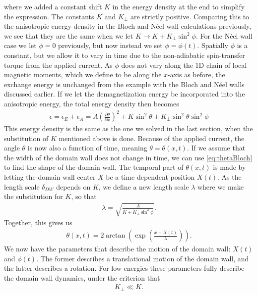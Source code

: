 \documentclass[12pt, a4paper, twoside, openright]{article}		%
\numberwithin{equation}{section}
\begin{document}
where we added a constant shift $K$ in the energy density at the end to simplify the expression. The constants $K$ and $K_{\perp}$ are strictly positive. Comparing this to the anisotropic energy density in the Bloch and N\'{e}el wall calculations previously, we see that they are the same when we let $K \rightarrow K + K_{\perp}\sin^2\phi$. For the N\'{e}el wall case we let $\phi = 0$ previously, but now instead we set $\phi = \phi (t)$. Spatially $\phi$ is a constant, but we allow it to vary in time due to the non-adiabatic spin-transfer torque from the applied current. As $\phi$ does not vary along the 1D chain of local magnetic moments, which we define to be along the $x$-axis as before, the exchange energy is unchanged from the example with the Bloch and N\'{e}el walls discussed earlier. If we let the demagnetization energy be incorporated into the anisotropic energy, the total energy density then becomes
\begin{align}
\label{eq:energydensity_ex_a}
\epsilon = \epsilon_E + \epsilon_A = A \left(\frac{\partial \theta}{\partial x}\right)^2 + K\sin^2\theta + K_{\perp} \sin^2\theta\sin^2\phi
\end{align}
This energy density is the same as the one we solved in the last section, when the substitution of $K$ mentioned above is done. Because of the applied current, the angle $\theta$ is now also a function of time, meaning $\theta = \theta(x,t)$. If we assume that the width of the domain wall does not change in time, we can use \eqref{eq:thetaBloch} to find the shape of the domain wall. The temporal part of $\theta(x,t)$ is made by letting the domain wall center $X$ be a time dependent position $X(t)$. As the length scale $\delta_{DW}$ depends on $K$, we define a new length scale $\lambda$ where we make the substitution for $K$, so that
\begin{align}
\label{eq:lambda_dw}
\lambda = \sqrt{\frac{A}{K + K_{\perp}\sin^2\phi}}.
\end{align}
Together, this gives us
\begin{align}
\label{eq:theta_current}
\theta(x,t) = 2\arctan\left(\exp(\frac{x-X(t)}{\lambda})\right).
\end{align}
We now have the parameters that describe the motion of the domain wall: $X(t)$ and $\phi(t)$. The former describes a translational motion of the domain wall, and the latter describes a rotation. For low energies these parameters fully describe the domain wall dynamics, under the criterion that
\begin{align}
\label{eq:kperp_ll_k}
K_{\perp} \ll K.
\end{align}
\end{document}
